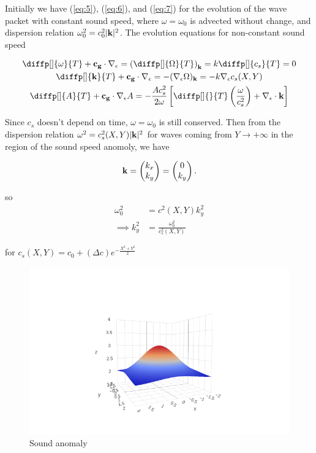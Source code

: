 Initially we have (\ref{eq:5}), (\ref{eq:6}), and (\ref{eq:7}) for the
evolution of the wave packet with constant sound speed, where $\omega
=\omega_0$ is advected without change, and dispersion relation $\omega_0^2
= c_0^2|{\bf k}|^2$. The evolution equations for non-constant sound speed

\begin{gather}
  \diffp[]{\omega }{T} + {\bf c_{g}}\cdot \nabla _{\epsilon } = \left(
  \diffp[]{\Omega}{T}\right)_{{\bf k}} = k \diffp[]{c_{s}}{T} = 0 \\
  \diffp[]{{\bf k}}{T} + {\bf c_{g}}\cdot \nabla _{\epsilon } = - (\nabla
  _{\epsilon }\Omega)_{{\bf k}} = -k \nabla _{\epsilon }c_{s}(X,Y) \\
  \diffp[]{A}{T} + {\bf c_{g}}\cdot \nabla _{\epsilon }A
  = - \frac{Ac_{s}^2}{2\omega } \left[ \diffp[]{}{T} \left(
  \frac{\omega}{c_{s}^2}\right) + \nabla _{\epsilon }\cdot {\bf k} \right]
\end{gather}


Since $c_{s}$ doesn't depend on time, $\omega = \omega_0$ is still conserved.
Then from the dispersion relation $\omega ^2 = c_{s}^2(X,Y) |{\bf k}|^2$ for waves
coming from $Y \rightarrow + \infty $ in the region of the sound speed anomoly, we have

\[
{\bf k} = \begin{pmatrix}
  k_{x} \\ k_{y}
\end{pmatrix} = \begin{pmatrix}
  0 \\ k_{y}
\end{pmatrix}
.\] 

so
\begin{align*}
  \omega_0 ^2 &= c^2(X,Y) k_{y}^2 \\
  \implies k_{y}^2  &= \frac{\omega_0 ^2}{c_{s}^2(X,Y)}
\end{align*}

for $c_{s}(X,Y) = c_0 + (\Delta c)e^{ -\frac{X^2+Y^2}{2}}$

\begin{figure}[H]
  \centering
  \includegraphics[width=0.8\linewidth]{sound_anomaly.png}
  \caption{Sound anomaly}%
  \label{fig:sound_anomaly}
\end{figure}


